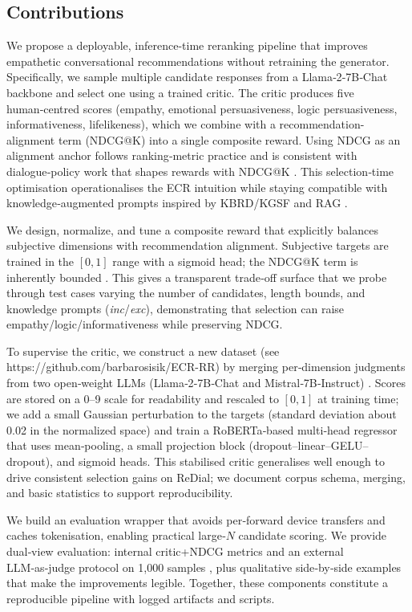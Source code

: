 \documentclass[12pt]{article}
\begin{document}
  \subsection{Contributions}
  We propose a deployable, inference-time reranking pipeline that improves empathetic conversational recommendations without retraining the generator. Specifically, we sample multiple candidate responses from a Llama‑2‑7B‑Chat backbone \citep{meta2023llama2} and select one using a trained critic. The critic produces five human‑centred scores (empathy, emotional persuasiveness, logic persuasiveness, informativeness, lifelikeness), which we combine with a recommendation- alignment term (NDCG@K) into a single composite reward. Using NDCG as an alignment anchor follows ranking‑metric practice and is consistent with dialogue‑policy work that shapes rewards with NDCG@K \citep{chen2021crsdp}. This selection‑time optimisation operationalises the ECR intuition \citep{zhang2024ecr} while staying compatible with knowledge‑augmented prompts inspired by KBRD/KGSF and RAG \citep{chen2020kbrd,zhou2020kgsf,lewis2020rag}.
  
  We design, normalize, and tune a composite reward that explicitly balances subjective dimensions with recommendation alignment. Subjective targets are trained in the \([0,1]\) range with a sigmoid head; the NDCG@K term is inherently bounded \citep{evidently_ndcg}. This gives a transparent trade‑off surface that we probe through test cases varying the number of candidates, length bounds, and knowledge prompts (\textit{inc}/\textit{exc}), demonstrating that selection can raise empathy/logic/informativeness while preserving NDCG.
  
  To supervise the critic, we construct a new  dataset (see https://github.com/barbarosisik/ECR-RR) by merging per‑dimension judgments from two open‑weight LLMs (Llama‑2‑7B‑Chat and Mistral‑7B‑Instruct) \citep{meta2023llama2,mistral2023}. Scores are stored on a 0–9 scale for readability and rescaled to \([0,1]\) at training time; we add a small Gaussian perturbation to the targets (standard deviation about 0.02 in the normalized space) and train a RoBERTa‑based multi‑head regressor \citep{liu2019roberta} that uses mean‑pooling, a small projection block (dropout–linear–GELU–dropout), and sigmoid heads. This stabilised critic generalises well enough to drive consistent selection gains on ReDial; we document corpus schema, merging, and basic statistics to support reproducibility.
  
  We build an evaluation wrapper that avoids per‑forward device transfers and caches tokenisation, enabling practical large‑$N$ candidate scoring. We provide dual‑view evaluation: internal critic+NDCG metrics and an external LLM‑as‑judge protocol on 1{,}000 samples \citep{yan2023llmjudge}, plus qualitative side‑by‑side examples that make the improvements legible. Together, these components constitute a reproducible pipeline with logged artifacts and scripts.
  
\end{document}
